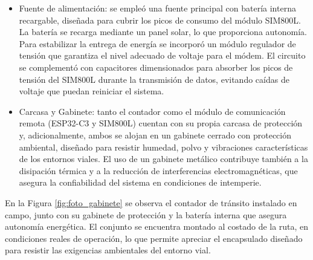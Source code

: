\begin{itemize}
\item Fuente de alimentación: se empleó una fuente principal con batería interna recargable, diseñada para cubrir los picos de consumo del módulo SIM800L. La batería se recarga mediante un panel solar, lo que proporciona autonomía. Para estabilizar la entrega de energía se incorporó un módulo regulador de tensión que garantiza el nivel adecuado de voltaje para el módem. El circuito se complementó con capacitores dimensionados para absorber los picos de tensión del SIM800L durante la transmisión de datos, evitando caídas de voltaje que puedan reiniciar el sistema.


\item Carcasa y Gabinete: tanto el contador como el módulo de comunicación remota (ESP32-C3 y SIM800L) cuentan con su propia carcasa de protección y, adicionalmente, ambos se alojan en un gabinete cerrado con protección ambiental, diseñado para resistir humedad, polvo y vibraciones características de los entornos viales. El uso de un gabinete metálico contribuye también a la disipación térmica y a la reducción de interferencias electromagnéticas, que asegura la confiabilidad del sistema en condiciones de intemperie. 

\end{itemize}

En la Figura \ref{fig:foto_gabinete} se observa el contador de tránsito instalado en campo, junto con su gabinete de protección y la batería interna que asegura autonomía energética. El conjunto se encuentra montado al costado de la ruta, en condiciones reales de operación, lo que permite apreciar el encapsulado diseñado para resistir las exigencias ambientales del entorno vial.


